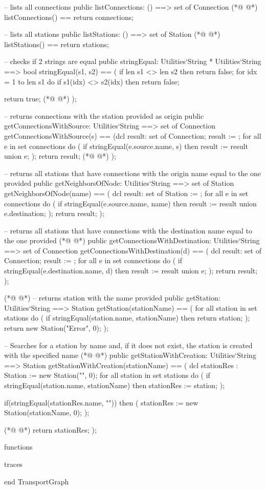 \begin{vdmpp}[breaklines=true]
 -- lists all connections
 public listConnections: () ==> set of Connection 
(*@
\label{listStations:65}
@*)
  listConnections() == return connections;
  
 -- lists all stations
 public listStations: () ==> set of Station
(*@
\label{stringEqual:69}
@*)
  listStations() == return stations;
  
 -- checks if 2 strings are equal
 public stringEqual: Utilities`String * Utilities`String ==> bool
 stringEqual(s1, s2) ==
 (
  if len s1 <> len s2 then
   return false;
  for idx = 1 to len s1 do
   if s1(idx) <> s2(idx) then return false;
  
  return true;
(*@
\label{getConnectionsWithSource:81}
@*)
 );
 
 -- returns connections with the station provided as origin
 public getConnectionsWithSource: Utilities`String ==> set of Connection
 getConnectionsWithSource(s) ==
 (dcl result: set of Connection;
  result := {};
  for all e in set connections do
  (
   if stringEqual(e.source.name, s) then result := result union {e}; 
  );
  return result;
(*@
\label{getConnection:93}
@*)
 );
 
 -- returns all stations that have connections with the origin name equal to the one provided
 public getNeighborsOfNode: Utilities`String ==> set of Station
 getNeighborsOfNode(name) ==
 (
  dcl result: set of Station := {};
  for all e in set connections do
  (
   if stringEqual(e.source.name, name) then result := result union {e.destination};
  );
  return result;
 );
 
 -- returns all stations that have connections with the destination name equal to the one provided
(*@
\label{getNeighborsOfNode:108}
@*)
 public getConnectionsWithDestination: Utilities`String ==> set of Connection
 getConnectionsWithDestination(d) ==
 (
  dcl result: set of Connection;
   result := {};
  for all e in set connections do
  (
   if stringEqual(e.destination.name, d) then result := result union {e}; 
  );
  return result;
 );   
 
(*@
\label{getConnectionsWithDestination:120}
@*)
 -- returns station with the name provided
 public getStation: Utilities`String ==> Station
 getStation(stationName) ==
 (
  for all station in set stations do (
   if stringEqual(station.name, stationName) then 
     return station;
  ); 
  return new Station("Error", 0);
 );
 
 
 -- Searches for a station by name and, if it does not exist, the station is created with the specified name 
(*@
\label{getStation:133}
@*)
 public getStationWithCreation: Utilities`String ==> Station
 getStationWithCreation(stationName) == 
 (
  dcl stationRes : Station := new Station("", 0);
  for all station in set stations do (
   if stringEqual(station.name, stationName) then stationRes := station;
  ); 
  
  if(stringEqual(stationRes.name, "")) then (
   stationRes := new Station(stationName, 0);
  );
  
(*@
\label{getStationWithCreation:145}
@*)
  return stationRes;
 );
 
functions

traces

end TransportGraph
\end{vdmpp}

